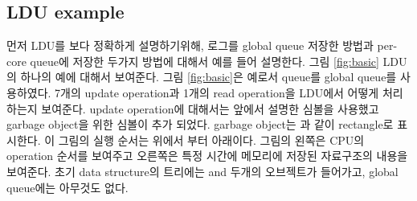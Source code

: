\subsection{LDU example}

%

\ifkor
먼저 LDU를 보다 정확하게 설명하기위해, 로그를 global queue 저장한 방법과 per-core queue에 저장한 두가지 방법에 대해서
예를 들어 설명한다. 
그림 \ref{fig:basic} LDU의 하나의 예에 대해서 보여준다. 그림 \ref{fig:basic}은 예로서 queue를 global
queue를 사용하였다. 
7개의 update operation과 1개의 read operation을 LDU에서 어떻게 처리하는지 보여준다.
update operation에 대해서는 앞에서 설명한 심볼을 사용했고 garbage object을 위한 심볼이 추가 되었다.
garbage object는 과 같이 rectangle로 표시한다. 
이 그림의 실행 순서는 위에서 부터 아래이다.
그림의 왼쪽은 CPU의 operation 순서를 보여주고 오른쪽은 특정 시간에 메모리에 저장된 자료구조의 내용을 보여준다.
초기 data structure의 트리에는  and  두개의 오브젝트가 들어가고, global
queue에는 아무것도 없다.
\else





\fi


